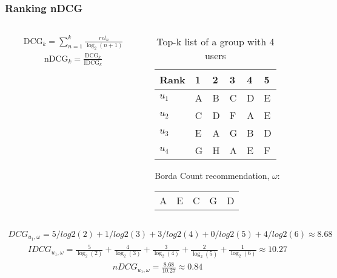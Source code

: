 \begin{frame}[t]
\frametitle{Ranking nDCG}
\begin{columns}
\begin{column}{0.45\textwidth}
\begin{align*}
\text{DCG}_k = \sum_{n=1}^{k}\frac{\textit{rel}_n}{\log_2(n + 1)}
\end{align*}
\begin{align*}
\text{nDCG}_k = \frac{\text{DCG}_k}{\text{IDCG}_k}
\end{align*}

\end{column}
\begin{column}{0.55\textwidth}
\small
\vspace{-0.5cm}
\begin{table}
\captionsetup{font=footnotesize}
\begin{tabular}{|l|lllll|} \hline
Rank  & 1 & 2 & 3 & 4 & 5 \\\hline
$u_1$ & A & B & C & D & E \\
$u_2$ & C & D & F & A & E \\
$u_3$ & E & A & G & B & D \\
$u_4$ & G & H & A & E & F\\\hline
\end{tabular}
\caption{Top-k list of a group with 4 users}
\end{table}
\normalsize
Borda Count recommendation, $\omega$: \\
\begin{table}
\centering
\begin{tabular}{lllll}
 A & E & C & G & D
\end{tabular}
\end{table}
\end{column}
\end{columns}
\small
\begin{align*}
DCG_{u_1, \omega} = 5/log2(2) + 1/log2(3) + 3/log2(4) + 0/log2(5) + 4/log2(6) \approx 8.68
\end{align*}
\begin{align*}
IDCG_{u_1, \omega} = \frac{5}{\log_2(2)}+\frac{4}{\log_2(3)}+\frac{3}{\log_2(4)}+\frac{2}{\log_2(5)}+\frac{1}{\log_2(6)} \approx 10.27
\end{align*}
\begin{align*}
nDCG_{u_1, \omega} = \frac{8.68}{10.27} \approx 0.84
\end{align*}
\normalsize
\end{frame}

%
%
%
